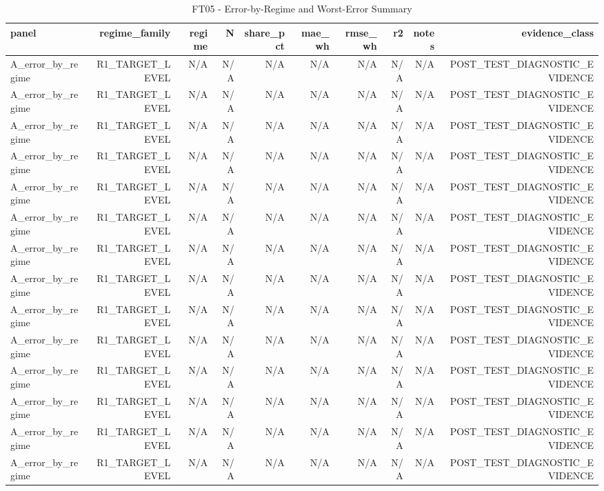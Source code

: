 \begin{table}[h!]
\centering
\caption{FT05 - Error-by-Regime and Worst-Error Summary}
\label{tab:ft05\_-\_error-by-regime\_and\_worst-error\_summary}
\begin{tabular}{lrrrrrrrrr}
\toprule
panel & regime\_family & regime & N & share\_pct & mae\_wh & rmse\_wh & r2 & notes & evidence\_class \\
\midrule
A\_error\_by\_regime & R1\_TARGET\_LEVEL & N/A & N/A & N/A & N/A & N/A & N/A & N/A & POST\_TEST\_DIAGNOSTIC\_EVIDENCE \\
A\_error\_by\_regime & R1\_TARGET\_LEVEL & N/A & N/A & N/A & N/A & N/A & N/A & N/A & POST\_TEST\_DIAGNOSTIC\_EVIDENCE \\
A\_error\_by\_regime & R1\_TARGET\_LEVEL & N/A & N/A & N/A & N/A & N/A & N/A & N/A & POST\_TEST\_DIAGNOSTIC\_EVIDENCE \\
A\_error\_by\_regime & R1\_TARGET\_LEVEL & N/A & N/A & N/A & N/A & N/A & N/A & N/A & POST\_TEST\_DIAGNOSTIC\_EVIDENCE \\
A\_error\_by\_regime & R1\_TARGET\_LEVEL & N/A & N/A & N/A & N/A & N/A & N/A & N/A & POST\_TEST\_DIAGNOSTIC\_EVIDENCE \\
A\_error\_by\_regime & R1\_TARGET\_LEVEL & N/A & N/A & N/A & N/A & N/A & N/A & N/A & POST\_TEST\_DIAGNOSTIC\_EVIDENCE \\
A\_error\_by\_regime & R1\_TARGET\_LEVEL & N/A & N/A & N/A & N/A & N/A & N/A & N/A & POST\_TEST\_DIAGNOSTIC\_EVIDENCE \\
A\_error\_by\_regime & R1\_TARGET\_LEVEL & N/A & N/A & N/A & N/A & N/A & N/A & N/A & POST\_TEST\_DIAGNOSTIC\_EVIDENCE \\
A\_error\_by\_regime & R1\_TARGET\_LEVEL & N/A & N/A & N/A & N/A & N/A & N/A & N/A & POST\_TEST\_DIAGNOSTIC\_EVIDENCE \\
A\_error\_by\_regime & R1\_TARGET\_LEVEL & N/A & N/A & N/A & N/A & N/A & N/A & N/A & POST\_TEST\_DIAGNOSTIC\_EVIDENCE \\
A\_error\_by\_regime & R1\_TARGET\_LEVEL & N/A & N/A & N/A & N/A & N/A & N/A & N/A & POST\_TEST\_DIAGNOSTIC\_EVIDENCE \\
A\_error\_by\_regime & R1\_TARGET\_LEVEL & N/A & N/A & N/A & N/A & N/A & N/A & N/A & POST\_TEST\_DIAGNOSTIC\_EVIDENCE \\
A\_error\_by\_regime & R1\_TARGET\_LEVEL & N/A & N/A & N/A & N/A & N/A & N/A & N/A & POST\_TEST\_DIAGNOSTIC\_EVIDENCE \\
A\_error\_by\_regime & R1\_TARGET\_LEVEL & N/A & N/A & N/A & N/A & N/A & N/A & N/A & POST\_TEST\_DIAGNOSTIC\_EVIDENCE \\

\end{tabular}
\end{table}
